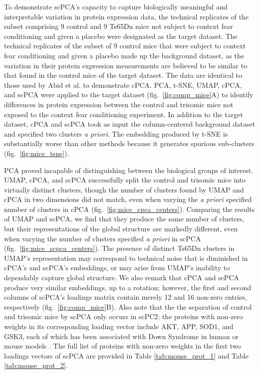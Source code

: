 \documentclass{article}
\begin{document}
To demonstrate scPCA's capacity to capture biologically meaningful and interpretable variation in protein expression data, the technical replicates of the subset comprising 9 control and 9 Ts65Dn mice not subject to context fear conditioning and given a placebo were designated as the target dataset. The technical replicates of the subset of 9 control mice that were subject to context fear conditioning and given a placebo made up the background dataset, as the variation in their protein expression measurements are believed to be similar to that found in the control mice of the target dataset. The data are identical to those used by Abid et al.  to demonstrate cPCA. PCA, t-SNE, UMAP, cPCA, and scPCA were applied to the target dataset (fig.~\ref{fig:comp_mice}A) to identify differences in protein expression between the control and trisomic mice not exposed to the context fear conditioning experiment. In addition to the target dataset, cPCA and scPCA took as input the column-centered background dataset and specified two clusters \textit{a priori}. The embedding produced by t-SNE is substantially worse than other methods because it generates spurious sub-clusters (fig.~\ref{fig:mice_tsne}).

PCA proved incapable of distinguishing between the biological groups of interest. UMAP, cPCA, and scPCA successfully split the control and trisomic mice into virtually distinct clusters, though the number of clusters found by UMAP and cPCA in two dimensions did not match, even when varying the \textit{a priori} specified number of clusters in cPCA (fig.~\ref{fig:mice_cpca_centers}). Comparing the results of UMAP and scPCA, we find that they produce the same number of clusters, but their representations of the global structure are markedly different, even when varying the number of clusters specified \textit{a priori} in scPCA (fig.~\ref{fig:mice_scpca_centers}). The presence of distinct Ts65Dn clusters in UMAP's representation may correspond to technical noise that is diminished in cPCA's and scPCA's embeddings, or may arise from UMAP's inability to dependably capture global structure. We also remark that cPCA and scPCA produce very similar embeddings, up to a rotation; however, the first and second columns of scPCA's loadings matrix contain merely 12 and 16 non-zero entries, respectively (fig.~\ref{fig:comp_mice}B). Also note that the the separation of control and trisomic mice by scPCA only occurs in scPC2: the proteins with non-zero weights in its corresponding loading vector include AKT, APP, SOD1, and GSK3, each of which has been associated with Down Syndrome in human or mouse models .  The full list of proteins with non-zero weights in the first two loadings vectors of scPCA are provided in Table \ref{tab:mouse_prot_1} and  Table \ref{tab:mouse_prot_2}.
\end{document}
